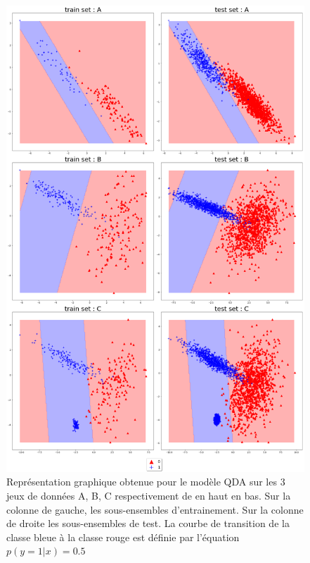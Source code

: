 \documentclass[12pt,a4paper,onecolumn]{article}
\begin{document}
\begin{figure}[H]
	\centering
	\includegraphics[height = 0.9\textheight]{linear}
	\caption{Représentation graphique obtenue pour le modèle QDA sur les 3 jeux de données A, B, C respectivement de en haut en bas. Sur la colonne de gauche, les sous-ensembles d'entrainement. Sur la colonne de droite les sous-ensembles de test. La courbe de transition de la classe bleue à la classe rouge est définie par l'équation \( p(y = 1 | x) = 0.5\)}
	\label{fig:QDA}
\end{figure}
\end{document}
